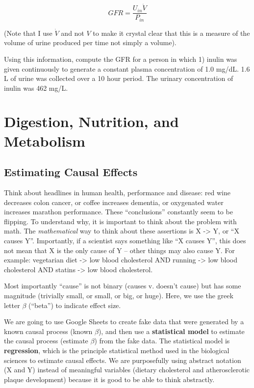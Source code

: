 \documentclass[]{book}
\begin{document}
\begin{equation}
GFR = \frac{U_{in} \dot{V}}{P_{in}}
\end{equation}

(Note that I use \(\dot{V}\) and not \(V\) to make it crystal clear that
this is a measure of the volume of urine produced per time not simply a
volume).

Using this information, compute the GFR for a person in which 1) inulin
was given continuously to generate a constant plasma concentration of
1.0 mg/dL. 1.6 L of urine was collected over a 10 hour period. The
urinary concentration of inulin was 462 mg/L.

\chapter{Digestion, Nutrition, and
Metabolism}\label{digestion-nutrition-and-metabolism}

\section{Estimating Causal Effects}\label{estimating-causal-effects}

Think about headlines in human health, performance and disease: red wine
decreases colon cancer, or coffee increases dementia, or oxygenated
water increases marathon performance. These ``conclusions'' constantly
seem to be flipping. To understand why, it is important to think about
the problem with math. The \emph{mathematical} way to think about these
assertions is X -\textgreater{} Y, or ``X causes Y''. Importantly, if a
scientist says something like ``X causes Y'', this does not mean that X
is the only cause of Y -- other things may also cause Y. For example:
vegetarian diet -\textgreater{} low blood cholesterol AND running
-\textgreater{} low blood cholesterol AND statins -\textgreater{} low
blood cholesterol.

Most importantly ``cause'' is not binary (causes v. doesn't cause) but
has some magnitude (trivially small, or small, or big, or huge). Here,
we use the greek letter \(\beta\) (``beta'') to indicate effect size.

We are going to use Google Sheets to create fake data that were
generated by a known causal process (known \(\beta\)), and then use a
\textbf{statistical model} to estimate the causal process (estimate
\(\beta\)) from the fake data. The statistical model is
\textbf{regression}, which is the principle statistical method used in
the biological sciences to estimate causal effects. We are purposefully
using abstract notation (X and Y) instead of meaningful variables
(dietary cholesterol and atherosclerotic plaque development) because it
is good to be able to think abstractly.
\end{document}
